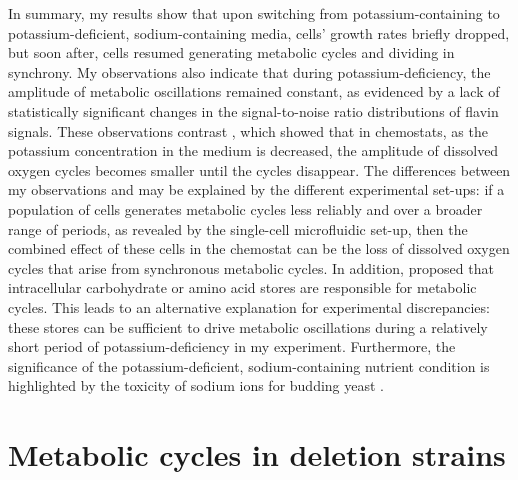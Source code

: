 In summary, my results show that upon switching from potassium-containing to potassium-deficient, sodium-containing media, cells' growth rates briefly dropped, but soon after, cells resumed generating metabolic cycles and dividing in synchrony.
My observations also indicate that during potassium-deficiency, the amplitude of metabolic oscillations remained constant, as evidenced by a lack of statistically significant changes in the signal-to-noise ratio distributions of flavin signals.
These observations contrast \textcite{oneillEukaryoticCellBiology2020}, which showed that in chemostats, as the potassium concentration in the medium is decreased, the amplitude of dissolved oxygen cycles becomes smaller until the cycles disappear.
The differences between my observations and \textcite{oneillEukaryoticCellBiology2020} may be explained by the different experimental set-ups: if a population of cells generates metabolic cycles less reliably and over a broader range of periods, as revealed by the single-cell microfluidic set-up, then the combined effect of these cells in the chemostat can be the loss of dissolved oxygen cycles that arise from synchronous metabolic cycles.
In addition, \textcite{oneillEukaryoticCellBiology2020} proposed that intracellular carbohydrate or amino acid stores are responsible for metabolic cycles.
This leads to an alternative explanation for experimental discrepancies: these stores can be sufficient to drive metabolic oscillations during a relatively short period of potassium-deficiency in my experiment.
Furthermore, the significance of the potassium-deficient, sodium-containing nutrient condition is highlighted by the toxicity of sodium ions for budding yeast \parencite{arinoAlkaliMetalCation2010,caseyEffectSaltsCofermentation2013,watcharawipasSodiumAcetateResponses2018}.


\section{Metabolic cycles in deletion strains}
\label{sec:biology-deletions}


